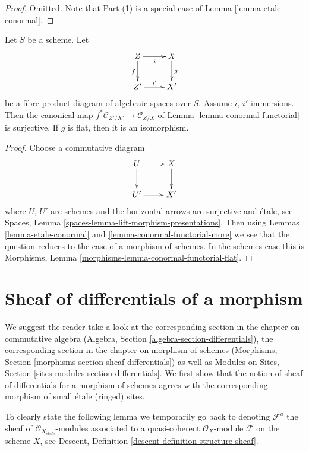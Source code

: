 \begin{proof}
Omitted. Note that Part (1) is a special case of
Lemma \ref{lemma-etale-conormal}.
\end{proof}

\begin{lemma}
\label{lemma-conormal-functorial-flat}
Let $S$ be a scheme. Let
$$
\xymatrix{
Z \ar[r]_i \ar[d]_f & X \ar[d]^g \\
Z' \ar[r]^{i'} & X'
}
$$
be a fibre product diagram of algebraic spaces over $S$. Assume
$i$, $i'$ immersions. Then the canonical map
$f^*\mathcal{C}_{Z'/X'} \to \mathcal{C}_{Z/X}$ of
Lemma \ref{lemma-conormal-functorial}
is surjective. If $g$ is flat, then it is an isomorphism.
\end{lemma}

\begin{proof}
Choose a commutative diagram
$$
\xymatrix{
U \ar[r] \ar[d] & X \ar[d] \\
U' \ar[r] & X'
}
$$
where $U$, $U'$ are schemes and the horizontal arrows are surjective
and \'etale, see
Spaces, Lemma \ref{spaces-lemma-lift-morphism-presentations}.
Then using
Lemmas \ref{lemma-etale-conormal} and \ref{lemma-conormal-functorial-more}
we see that the question reduces to the case of a morphism of schemes.
In the schemes case this is
Morphisms, Lemma \ref{morphisms-lemma-conormal-functorial-flat}.
\end{proof}





\section{Sheaf of differentials of a morphism}
\label{section-sheaf-differentials}

\noindent
We suggest the reader take a look at the corresponding section
in the chapter on commutative algebra
(Algebra, Section \ref{algebra-section-differentials}),
the corresponding section in the chapter on morphism of schemes
(Morphisms, Section \ref{morphisms-section-sheaf-differentials})
as well as
Modules on Sites, Section \ref{sites-modules-section-differentials}.
We first show that the notion of sheaf of differentials for a
morphism of schemes agrees with the corresponding morphism of
small \'etale (ringed) sites.

\medskip\noindent
To clearly state the following lemma we temporarily go back to
denoting $\mathcal{F}^a$ the sheaf of $\mathcal{O}_{X_{\acute{e}tale}}$-modules
associated to a quasi-coherent $\mathcal{O}_X$-module $\mathcal{F}$
on the scheme $X$, see
Descent, Definition \ref{descent-definition-structure-sheaf}.

